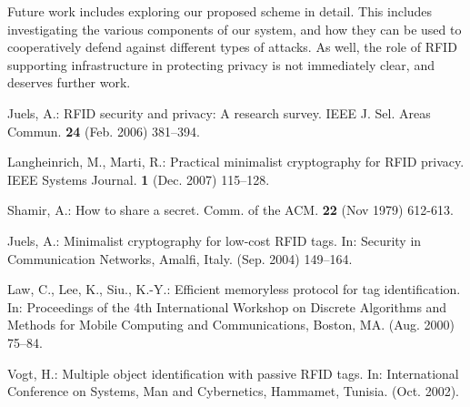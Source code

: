 Future work includes exploring our proposed scheme in detail.  This includes investigating the various components of our system, and how they can be used to cooperatively defend against different types of attacks.  As well, the role of RFID supporting infrastructure in protecting privacy is not immediately clear, and deserves further work.
%
%
\begin{thebibliography}{6}
%
Juels, A.:
RFID security and privacy:  A research survey.
IEEE J. Sel. Areas Commun. {\bf 24} (Feb. 2006) 381--394.

Langheinrich, M., Marti, R.:
Practical minimalist cryptography for RFID privacy.
IEEE Systems Journal. {\bf 1} (Dec. 2007) 115--128.

Shamir, A.:
How to share a secret.
Comm. of the ACM. {\bf 22} (Nov 1979) 612-613.

Juels, A.:
Minimalist cryptography for low-cost RFID tags.
In: Security in Communication Networks, Amalfi, Italy. (Sep. 2004) 149--164.

Law, C., Lee, K., Siu., K.-Y.:
Efficient memoryless protocol for tag identification.
In: Proceedings of the 4th International Workshop on Discrete Algorithms and Methods for Mobile Computing and Communications, Boston, MA. (Aug. 2000) 75--84.

Vogt, H.:
Multiple object identification with passive RFID tags.
In: International Conference on Systems, Man and Cybernetics, Hammamet, Tunisia. (Oct. 2002).

%
%
%
%
\end{thebibliography}
%

